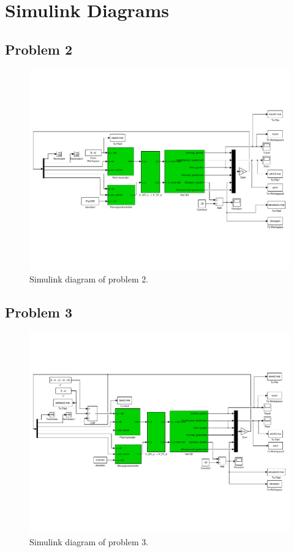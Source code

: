 \section{Simulink Diagrams}\label{sec:simulink}
\subsection{Problem 2}
\begin{figure}[h]
	\centering
		\includegraphics[trim=0 120 0 120,clip,width = \textwidth]{figures/problem2_simulink.pdf}
	\caption{Simulink diagram of problem 2.}
	\label{fig:problem2_simulink}
\end{figure}
\clearpage
\subsection{Problem 3}
\begin{figure}[h]
	\centering
	\includegraphics[trim=0 120 0 120,clip,width = \textwidth]{figures/problem3_simulink.pdf}
	\caption{Simulink diagram of problem 3.}
	\label{fig:problem3_simulink}
\end{figure}

